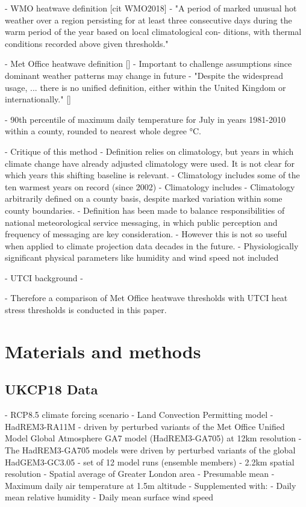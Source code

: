 \documentclass[10pt,letterpaper]{article}
\begin{document}
- WMO heatwave definition [cit WMO2018]
    - "A period of marked unusual hot weather
over a region persisting for at least three consecutive days during the warm period of the year based on local climatological con- ditions, with thermal conditions recorded above given thresholds." 

- Met Office heatwave definition [\cite{McCarthy2019}]
    - Important to challenge assumptions since dominant weather patterns may change in future 
    - "Despite the widespread usage, ... there is no unified definition, either within the United Kingdom or internationally." [\cite{McCarthy2019}]
    
    - 90th percentile of maximum daily temperature for July in years 1981-2010 within a county, rounded to nearest whole degree °C.

    - Critique of this method
        - Definition relies on climatology, but years in which climate change have already adjusted climatology were used. It is not clear for which years this shifting baseline is relevant.
        - Climatology includes some of the ten warmest years on record (since 2002)
        - Climatology includes 
        - Climatology arbitrarily defined on a county basis, despite marked variation within some county boundaries.
        - Definition has been made to balance responsibilities of national meteorological service messaging, in which public perception and frequency of messaging are key consideration.
        - However this is not so useful when applied to climate projection data decades in the future.
        - Physiologically significant physical parameters like humidity and wind speed not included 
    
- UTCI background
    - 

- Therefore a comparison of Met Office heatwave thresholds with UTCI heat stress thresholds is conducted in this paper.

\section*{Materials and methods}

\subsection*{UKCP18 Data}

- RCP8.5 climate forcing scenario
- Land Convection Permitting model
    - HadREM3-RA11M
    - driven by perturbed variants of the Met Office Unified Model Global Atmosphere GA7 model (HadREM3-GA705) at 12km resolution
    - The HadREM3-GA705 models were driven by perturbed variants of the global HadGEM3-GC3.05
- set of 12 model runs (ensemble members)
- 2.2km spatial resolution
    - Spatial average of Greater London area
    - Presumable mean
- Maximum daily air temperature at 1.5m altitude
- Supplemented with:
    - Daily mean relative humidity
    - Daily mean surface wind speed
\end{document}
